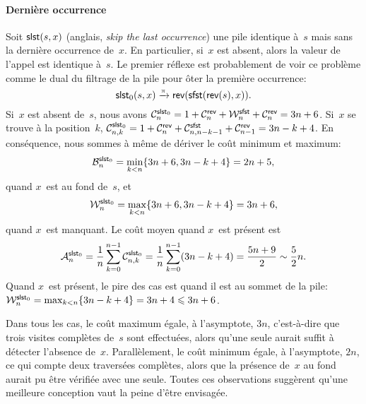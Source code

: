 \paragraph{Dernière occurrence}

Soit \(\fun{slst}(s,x)\) (anglais, \emph{skip
  the last occurrence}) une pile identique à~\(s\) mais sans la
dernière occurrence de~\(x\). En particulier, si~\(x\) est absent,
alors la valeur de l'appel est identique à~\(s\). Le premier réflexe
est probablement de voir ce problème comme le dual du filtrage de la
pile pour ôter la première occurrence:
\begin{equation}
  \fun{slst}_0(s,x) \xrightarrow{\smash{\pi}}
                  \fun{rev}(\fun{sfst}(\fun{rev}(s),x)).
\label{eq_slst0}
\end{equation}
Si~\(x\) est absent de~\(s\), nous avons
\(\C{\fun{slst}_0}{n} = 1 + \C{\fun{rev}}{n} + \W{\fun{sfst}}{n} +
\C{\fun{rev}}{n} = 3n+6\). Si~\(x\) se trouve à la position~\(k\),
\(\C{\fun{slst}_0}{n,k} = 1 + \C{\fun{rev}}{n} +
\C{\fun{sfst}}{n,n-k-1} + \C{\fun{rev}}{n-1} = 3n - k + 4\). En
conséquence, nous sommes à même de dériver le coût minimum et
maximum:
\begin{equation*}
\abovedisplayskip=0pt
\belowdisplayskip=0pt
\B{\fun{slst}_0}{n} = \min_{k < n}\{3n+6,3n-k+4\} = 2n + 5,
\end{equation*}
quand \(x\)~est au fond de~\(s\), et
\begin{equation*}
\abovedisplayskip=0pt
\belowdisplayskip=0pt
\W{\fun{slst}_0}{n} = \max_{k < n}\{3n+6,3n-k+4\} = 3n+6,
\end{equation*}
quand \(x\)~est manquant.  Le coût
moyen quand \(x\)~est présent est
\begin{equation*}
\M{\fun{slst}_0}{n} =
\frac{1}{n}\sum_{k=0}^{n-1}\C{\fun{slst}_0}{n,k} =
\frac{1}{n}\sum_{k=0}^{n-1}(3n - k + 4) = \frac{5n+9}{2} \sim
\frac{5}{2}n.
\end{equation*}
Quand \(x\)~est présent, le pire des cas est quand il est au sommet de
la pile: \(\W{\fun{slst}_0}{n} = \max_{k<n}\{3n - k + 4\} = 3 n+ 4
\leqslant 3n + 6\).

Dans tous les cas, le coût maximum égale, à l'asymptote, \(3n\),
c'est-à-dire que trois visites complètes de~\(s\) sont effectuées,
alors qu'une seule aurait suffit à détecter l'absence
de~\(x\). Parallèlement, le coût minimum égale, à l'asymptote, \(2n\),
ce qui compte deux traversées complètes, alors que la présence
de~\(x\) au fond aurait pu être vérifiée avec une seule. Toutes ces
observations suggèrent qu'une meilleure conception vaut la peine
d'être envisagée.

